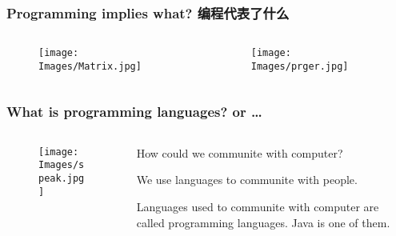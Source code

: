 \documentclass[
  11pt, %
  xcolor=dvipsnames
]{beamer}
\begin{document}
\begin{frame}
	\frametitle{Programming implies what? 编程代表了什么}



	\begin{columns}[c]
		\begin{column}{0.5\textwidth}
			\begin{figure}[hpt]
				\texttt{[image: Images/Matrix.jpg]}
				\caption{}\label{fig:1.1}
			\end{figure}
		\end{column}
		\begin{column}{0.5\textwidth}
			\begin{figure}[hpt]
				\begin{center}
					\texttt{[image: Images/prger.jpg]}
				\end{center}
				\caption{}\label{fig:1.2}
			\end{figure}
		\end{column}
	\end{columns}

\end{frame}


\begin{frame}[fragile]
	\frametitle{What is programming languages? or \dots}



	\begin{columns}[c]{2}
		\begin{column}{0.45\textwidth}
			\begin{figure}
				\begin{center}
					\texttt{[image: Images/speak.jpg]}
				\end{center}
				\caption{}\label{fig:}
			\end{figure}
		\end{column}
		\begin{column}{0.55\textwidth}
			How could we communite with computer?

			We use languages to communite with people.

			Languages used to communite with computer are called programming languages.
			Java is one of them.

		\end{column}
	\end{columns}

\end{frame}
\end{document}

